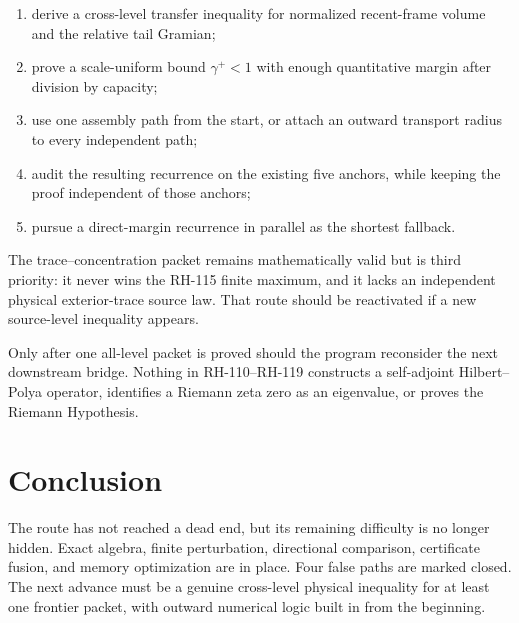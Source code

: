\documentclass[12pt]{article}
\begin{document}
\begin{enumerate}
 \item derive a cross-level transfer inequality for normalized recent-frame
 volume and the relative tail Gramian;
 \item prove a scale-uniform bound $\gamma^+<1$ with enough quantitative
 margin after division by capacity;
 \item use one assembly path from the start, or attach an outward transport
 radius to every independent path;
 \item audit the resulting recurrence on the existing five anchors, while
 keeping the proof independent of those anchors;
 \item pursue a direct-margin recurrence in parallel as the shortest
 fallback.
\end{enumerate}

The trace--concentration packet remains mathematically valid but is third
priority: it never wins the RH-115 finite maximum, and it lacks an independent
physical exterior-trace source law.  That route should be reactivated if a
new source-level inequality appears.

Only after one all-level packet is proved should the program reconsider the
next downstream bridge.  Nothing in RH-110--RH-119 constructs a self-adjoint
Hilbert--Polya operator, identifies a Riemann zeta zero as an eigenvalue, or
proves the Riemann Hypothesis.

\section{Conclusion}
The route has not reached a dead end, but its remaining difficulty is no
longer hidden.  Exact algebra, finite perturbation, directional comparison,
certificate fusion, and memory optimization are in place.  Four false paths
are marked closed.  The next advance must be a genuine cross-level physical
inequality for at least one frontier packet, with outward numerical logic
built in from the beginning.



\end{document}
